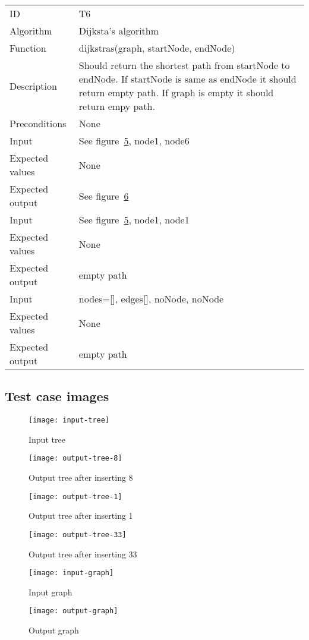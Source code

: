 \documentclass {article}
\begin{document}
\begin{tabular}{ | l p{10cm} | }
\hline
ID & T6 \\
Algorithm & Dijksta's algorithm \\
Function & dijkstras(graph, startNode, endNode) \\
Description & Should return the shortest path from startNode to endNode. If startNode is same as endNode it should return empty path. If graph is empty it should return empy path.\\
Preconditions & None \\
Input & See figure~\ref{fig:input-graph}, node1, node6 \\
Expected values & None \\
Expected output &  See figure~\ref{fig:output-graph} \\
Input & See figure~\ref{fig:input-graph}, node1, node1\\
Expected values & None \\
Expected output & empty path \\
Input & nodes=[], edges[], noNode, noNode \\
Expected values & None \\
Expected output & empty path \\
\hline
\end{tabular}
\subsection{Test case images}
\begin{figure}[H]
\texttt{[image: input-tree]}

\caption{Input tree}
\label{fig:input-tree}
\end{figure}

\begin{figure}[H]
\texttt{[image: output-tree-8]}

\caption{Output tree after inserting 8}
\label{fig:output-tree-8}
\end{figure}

\begin{figure}[H]
\texttt{[image: output-tree-1]}

\caption{Output tree after inserting 1}
\label{fig:output-tree-1}
\end{figure}

\begin{figure}[H]
\texttt{[image: output-tree-33]}

\caption{Output tree after inserting 33}
\label{fig:output-tree-33}
\end{figure}

\begin{figure}[H]
\texttt{[image: input-graph]}

\caption{Input graph}
\label{fig:input-graph}
\end{figure}

\begin{figure}[H]
\texttt{[image: output-graph]}

\caption{Output graph}
\label{fig:output-graph}
\end{figure}
\end{document}
